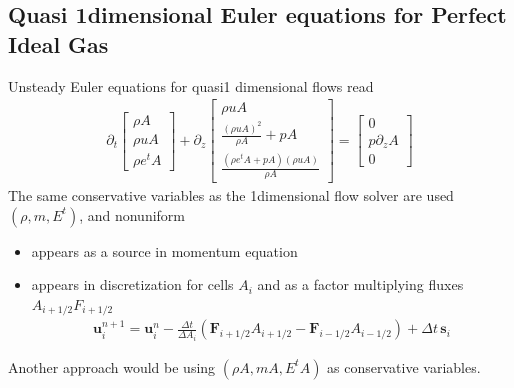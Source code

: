 \documentclass[letterpaper,10pt,english]{jupyterBook}
\begin{document}
\subsection{Quasi 1\sphinxhyphen{}dimensional Euler equations for Perfect Ideal Gas}
\label{\detokenize{ch/pde/euler-quasi-1d:quasi-1-dimensional-euler-equations-for-perfect-ideal-gas}}\label{\detokenize{ch/pde/euler-quasi-1d:pde-fvm-hyperbolic-examples-euler-quasi-1d}}\label{\detokenize{ch/pde/euler-quasi-1d::doc}}
\sphinxAtStartPar
Unsteady Euler equations for quasi\sphinxhyphen{}1 dimensional flows read
\begin{equation*}
\begin{split}
  \partial_t \begin{bmatrix} \rho A \\ \rho u A \\ \rho e^t A \end{bmatrix} +
  \partial_z \begin{bmatrix} \rho u A \\ \frac{( \rho u A )^2}{\rho A} + p A \\ \frac{ (\rho e^t A + p A) (\rho u A) }{ \rho A }  \end{bmatrix}
  = \begin{bmatrix} 0 \\ p \partial_z A \\ 0 \end{bmatrix}
\end{split}
\end{equation*}
\sphinxAtStartPar
{} The same conservative variables as the 1\sphinxhyphen{}dimensional flow solver are used \((\rho, m, E^t)\), and non\sphinxhyphen{}uniform
\begin{itemize}
\item {} 
\sphinxAtStartPar
appears as a source in momentum equation

\item {} 
\sphinxAtStartPar
appears in discretization for cells \(A_i\) and as a factor multiplying fluxes \(A_{i+1/2} F_{i+1/2}\)
\begin{equation*}
\begin{split}\mathbf{u}_i^{n+1} = \mathbf{u}_i^{n} - \frac{\Delta t}{\Delta A_i} \left( \mathbf{F}_{i+1/2} A_{i+1/2} - \mathbf{F}_{i-1/2} A_{i-1/2} \right) + \Delta t \, \mathbf{s}_i\end{split}
\end{equation*}
\end{itemize}

\sphinxAtStartPar
{} Another approach would be using \((\rho A, m A, E^t A)\)  as conservative variables.
\end{document}
